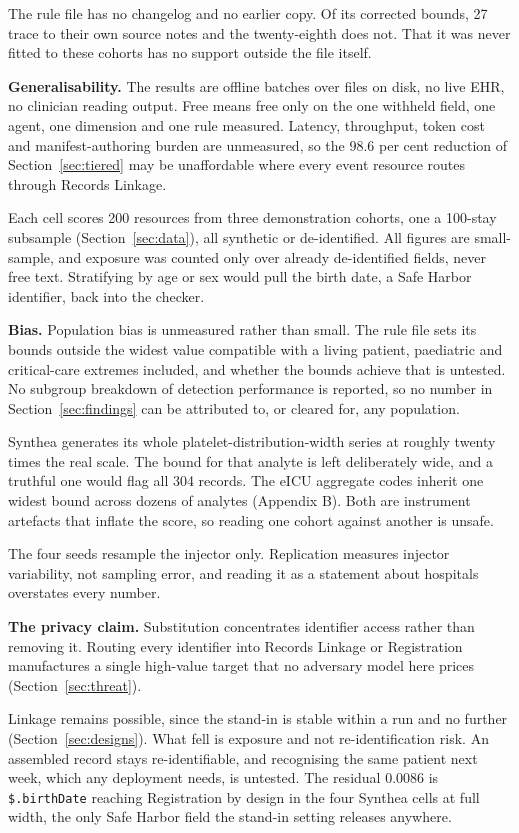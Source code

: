 The rule file has no changelog and no earlier copy. Of its corrected bounds, 27 trace to their own
source notes and the twenty-eighth does not. That it was never fitted to these cohorts has no
support outside the file itself.

\textbf{Generalisability.} The results are offline batches over files on disk, no live EHR, no
clinician reading output. Free means free only on the one withheld field, one agent, one dimension
and one rule measured. Latency, throughput, token cost and manifest-authoring burden are
unmeasured, so the 98.6 per cent reduction of Section~\ref{sec:tiered} may be unaffordable where
every event resource routes through Records Linkage.

Each cell scores 200 resources from three demonstration cohorts, one a 100-stay subsample
(Section~\ref{sec:data}), all synthetic or de-identified. All figures are small-sample, and
exposure was counted only over already de-identified fields, never free text. Stratifying by age
or sex would pull the birth date, a Safe Harbor identifier, back into the checker.

\textbf{Bias.} Population bias is unmeasured rather than small. The rule file sets its bounds outside
the widest value compatible with a living patient, paediatric and critical-care extremes included,
and whether the bounds achieve that is untested. No subgroup breakdown of detection performance is
reported, so no number in Section~\ref{sec:findings} can be attributed to, or cleared for, any
population.

Synthea generates its whole platelet-distribution-width series at roughly twenty times the real
scale. The bound for that analyte is left deliberately wide, and a truthful one would flag all 304
records. The eICU aggregate codes inherit one widest bound across dozens of analytes (Appendix B).
Both are instrument artefacts that inflate the score, so reading one cohort against another is
unsafe.

The four seeds resample the injector only. Replication measures injector variability, not sampling
error, and reading it as a statement about hospitals overstates every number.

\textbf{The privacy claim.} Substitution concentrates identifier access rather than removing it.
Routing every identifier into Records Linkage or Registration manufactures a single high-value target
that no adversary model here prices (Section~\ref{sec:threat}).

Linkage remains possible, since the stand-in is stable within a run and no further
(Section~\ref{sec:designs}). What fell is exposure and not re-identification risk. An assembled
record stays re-identifiable, and recognising the same patient next week, which any deployment
needs, is untested. The residual 0.0086 is \texttt{\$.birthDate} reaching Registration by design
in the four Synthea cells at full width, the only Safe Harbor field the stand-in setting releases
anywhere.

